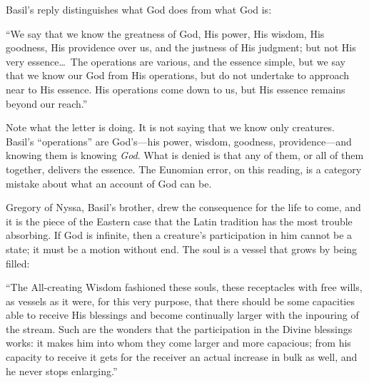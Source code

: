 Basil's reply distinguishes what God does from what God is:

\begin{studyframe}
``We say that we know the greatness of God, His power, His wisdom, His goodness, His providence over us, and the justness of His judgment; but not His very essence\ldots\ The operations are various, and the essence simple, but we say that we know our God from His operations, but do not undertake to approach near to His essence. His operations come down to us, but His essence remains beyond our reach.''
\end{studyframe}

Note what the letter is doing. It is not saying that we know only creatures. Basil's ``operations'' are God's---his power, wisdom, goodness, providence---and knowing them is knowing \emph{God}. What is denied is that any of them, or all of them together, delivers the essence. The Eunomian error, on this reading, is a category mistake about what an account of God can be.

Gregory of Nyssa, Basil's brother, drew the consequence for the life to come, and it is the piece of the Eastern case that the Latin tradition has the most trouble absorbing. If God is infinite, then a creature's participation in him cannot be a state; it must be a motion without end. The soul is a vessel that grows by being filled:

\begin{studyframe}
``The All-creating Wisdom fashioned these souls, these receptacles with free wills, as vessels as it were, for this very purpose, that there should be some capacities able to receive His blessings and become continually larger with the inpouring of the stream. Such are the wonders that the participation in the Divine blessings works: it makes him into whom they come larger and more capacious; from his capacity to receive it gets for the receiver an actual increase in bulk as well, and he never stops enlarging.''
\end{studyframe}

